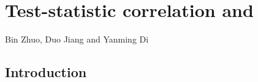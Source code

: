 \section{Test-statistic correlation and \popucor}\label{chap2}
\vspace*{5cm}
\begin{centering}
	{\normalsize Bin Zhuo, Duo Jiang and Yanming Di}\\[.04\textheight]
\end{centering}	
\vspace*{5cm}

\newpage
\begin{abstract}
	We investigate the relationship between correlation among test statistics and \popucor. 
	In FDR control procedures and gene-set enrichment analysis, the sample correlation of 
	observed data are often used to approximate the 
	test-statistic correlation. We show, however, that such an approximation is only valid 
	under 
	limited settings. In particular, we derive a formula for the correlation between test 
	statistics when 
	they take a specific form. As a special case, we present the exact expression of test-statistic 
	correlation for equal-variance two-sample $t$-test statistic under bivariate 
	normal assumption. 
	
	
\end{abstract}

\subsection{Introduction}
%	
%
%	


